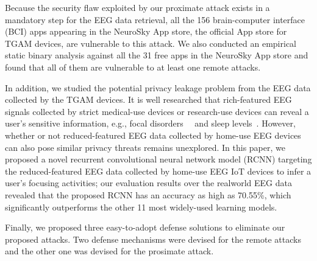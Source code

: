 Because the security flaw exploited by our proximate attack exists in a mandatory step for the EEG data retrieval, all the 156 brain-computer interface (BCI) apps appearing in the NeuroSky App store, the official App store for TGAM devices, are vulnerable to this attack. We also conducted an empirical static binary analysis against all the 31 free apps in the NeuroSky App store and found that all of them are vulnerable to at least one remote attacks. %

\indent In addition, we studied the potential privacy leakage problem from the EEG data collected by the TGAM devices. It is well researched that rich-featured EEG signals collected by strict medical-use devices or research-use devices can reveal a user's sensitive information, e.g., focal disorders~\cite{eegdiagnosis}~\cite{dauwels2010diagnosis} and sleep levels~\cite{nakamura2017automatic}. However, whether or not reduced-featured EEG data collected by home-use EEG devices can also pose similar privacy threats remains unexplored. In this paper, we proposed a novel recurrent convolutional neural network model (RCNN) targeting the reduced-featured EEG data collected by home-use EEG IoT devices to infer a user's focusing activities; our evaluation results over the realworld EEG data revealed that the proposed RCNN has an accuracy as high as 70.55\%, which significantly outperforms the other 11 most widely-used learning models.

Finally, we proposed three easy-to-adopt defense solutions to eliminate our proposed attacks. Two defense mechanisms were devised for the remote attacks and the other one was devised for the prosimate attack.

